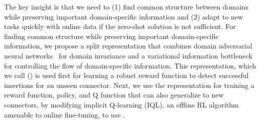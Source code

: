 
The key insight is that we need to (1) find common structure between domains while preserving important domain-specific information and (2) adapt to new tasks quickly with online data if the zero-shot solution is not sufficient.
For finding common structure while preserving important domain-specific information, we propose a split representation that combines domain adversarial neural networks~\cite{ganin2016domainadversarial} for domain invariance and a variational information bottleneck~\cite{alemi2017vib}
for controlling the flow of domain-specific information.
This representation, which we call \methodname{} (\methodabbrv) is used first for learning a robust reward function to detect successful insertions for an unseen connector.
Next, we use the representation for training a reward function, policy, and Q function that can also generalize to new connectors, by modifying implicit Q-learning (IQL), an offline RL algorithm amenable to online fine-tuning, to use \methodabbrv{}.

